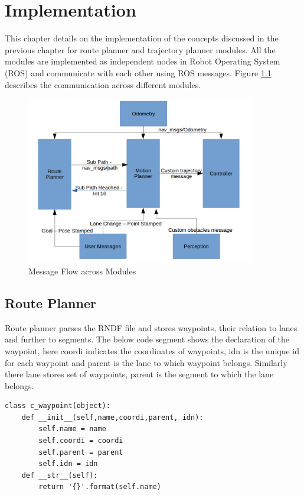 \chapter{Implementation}
\label{implementation}
This chapter details on the implementation of the concepts discussed in the previous chapter for route planner and trajectory planner modules. All the modules are implemented as independent nodes in Robot Operating System (ROS) and communicate with each other using ROS messages. Figure \ref{message_flow} describes the communication across different modules. 

\begin{figure}[H]
	\centering
	\includegraphics[width=0.9\textwidth]{Images/implementation/message_flow.png}
	\caption{Message Flow across Modules}
	\label{message_flow}
\end{figure}


\section{Route Planner}
Route planner parses the RNDF file and stores waypoints, their relation to lanes and further to segments. The below code segment shows the declaration of the waypoint, here coordi indicates the coordinates of waypoints, idn is the unique id for each waypoint and parent is the lane to which waypoint belongs. Similarly there lane stores set of waypoints, parent is the segment to which the lane belongs. 

\begin{lstlisting}
class c_waypoint(object):
	def __init__(self,name,coordi,parent, idn):
		self.name = name
		self.coordi = coordi
		self.parent = parent
		self.idn = idn
	def __str__(self):
		return '{}'.format(self.name)

\end{lstlisting}

